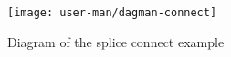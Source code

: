\begin{figure}[hbt]
\centering
\texttt{[image: user-man/dagman-connect]}
\caption{\label{fig:dagman-connect}Diagram of the splice connect example}

\end{figure}

